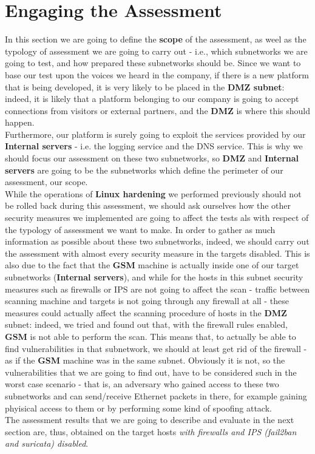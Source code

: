 \section{Engaging the Assessment}
In this section we are going to define the \textbf{scope} of the assessment, as weel as the typology of assessment we are going to carry out - i.e., which subnetworks we are going to test, and how prepared these subnetworks should be. Since we want to base our test upon the voices we heard in the company, if there is a new platform that is being developed, it is very likely to be placed in the \textbf{DMZ subnet}: indeed, it is likely that a platform belonging to our company is going to accept connections from visitors or external partners, and the \textbf{DMZ} is where this should happen.\\
Furthermore, our platform is surely going to exploit the services provided by our \textbf{Internal servers} - i.e. the logging service and the DNS service. This is why we should focus our assessment on these two subnetworks, so \textbf{DMZ} and \textbf{Internal servers} are going to be the subnetworks which define the perimeter of our assessment, our scope.\\
While the operations of \textbf{Linux hardening} we performed previously should not be rolled back during this assessment, we should ask ourselves how the other security measures we implemented are going to affect the tests als with respect of the typology of assessment we want to make. In order to gather as much information as possible about these two subnetworks, indeed, we should carry out the assessment with almost every security measure in the targets disabled. This is also due to the fact that the \textbf{GSM} machine is actually inside one of our target subnetworks (\textbf{Internal servers}), and while for the hosts in this subnet security measures such as firewalls or IPS are not going to affect the scan - traffic between scanning machine and targets is not going through any firewall at all - these measures could actually affect the scanning procedure of hosts in the \textbf{DMZ} subnet: indeed, we tried and found out that, with the firewall rules enabled, \textbf{GSM} is not able to perform the scan. This means that, to actually be able to find vulnerabilities in that subnetwork, we should at least get rid of the firewall - as if the \textbf{GSM} machine was in the same subnet. Obviously it is not, so the vulnerabilities that we are going to find out, have to be considered such in the worst case scenario - that is, an adversary who gained access to these two subnetworks and can send/receive Ethernet packets in there, for example gaining phyisical access to them or by performing some kind of spoofing attack.\\
The assessment results that we are going to describe and evaluate in the next section are, thus, obtained on the target hosts \textit{with firewalls and IPS (fail2ban and suricata) disabled}.
